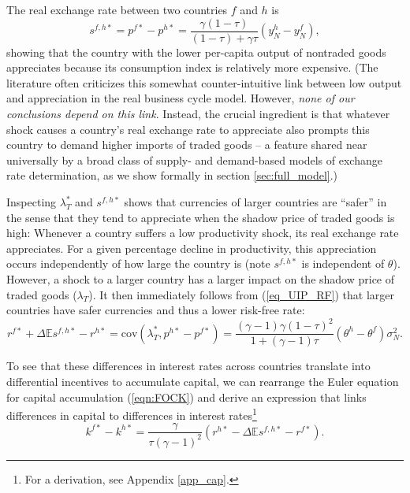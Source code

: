 \documentclass[12pt,letter]{article}
\theoremstyle{break} \theorembodyfont{\normalfont\itshape}
\theoremstyle{break}
\theoremstyle{break} \theorembodyfont{\normalfont\itshape}
\theoremstyle{break} \theorembodyfont{\normalfont\itshape}
\begin{document}
The real exchange rate between two countries $f$ and $h$ is
\begin{equation}
  s^{f, h \ast} = p^{f \ast} - p^{h \ast} = \frac{\gamma (1 - \tau)}{(1 - \tau) + \gamma\tau}
  \left( y_N^h - y_N^f \right),
  \label{eqn:rerNP}
\end{equation}
showing that the country with the lower per-capita output of nontraded
goods appreciates because its consumption index is relatively more
expensive. ({The literature often criticizes this somewhat
  counter-intuitive link between low output and appreciation in the
  real business cycle model. However, \textit{none of our conclusions
    depend on this link}. Instead, the crucial ingredient is that
  whatever shock causes a country's real exchange rate to appreciate
  also prompts this country to demand higher imports of traded goods
  -- a feature shared near universally by a broad class of supply- and
  demand-based models of exchange rate determination, as we show
  formally in section \ref{sec:full_model}.) }

Inspecting $\lambda_{T}^\ast$ and $s^{f, h \ast}$ shows that
currencies of larger countries are ``safer'' in the sense that they
tend to appreciate when the shadow price of traded goods is high:
Whenever a country suffers a low productivity shock, its real exchange
rate appreciates. For a given percentage decline in productivity, this
appreciation occurs independently of how large the country is (note
$s^{f, h \ast}$ is independent of $\theta$). However, a shock to a
larger country has a larger impact on the shadow price of traded goods
(\(\lambda_{T}\)). It then immediately follows from (\ref{eq_UIP_RF})
that larger countries have safer currencies and thus a lower risk-free
rate:
\begin{equation}
  r^{f \ast} + \Delta \mathbb{E} s^{f, h \ast} - r^{h \ast}
  = \text{cov} \left( \lambda_T^\ast, p^{h \ast} - p^{f \ast} \right)
  = \frac{(\gamma - 1) \gamma (1 - \tau)^2}{1 + (\gamma - 1) \tau}\left(\theta^h - \theta^f\right) \sigma_N^2.
  \label{eq_FF_UIP}
\end{equation}

To see that these differences in interest rates across countries
translate into differential incentives to accumulate capital, we can
rearrange the Euler equation for capital accumulation (\ref{eqn:FOCK})
and derive an expression that links differences in capital to
differences in interest rates\footnote{For a derivation, see Appendix
  \ref{app_cap}.}
\begin{equation}\label{eq_link_k_r}
  k^{f\ast}-k^{h\ast} = \frac{\gamma}{\tau(\gamma-1)^2}\left(r^{h \ast} - \Delta \mathbb{E} s^{f, h \ast} - r^{f \ast}\right).
\end{equation}
\end{document}
